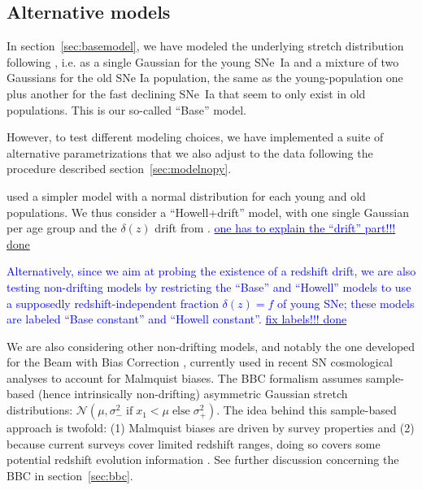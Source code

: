 \documentclass[]{aa} %
\newcommand{\nn}[1]{{\textcolor[rgb]{1, 0.27, 0}{#1}}}
\newcommand{\yc}[1]{{\textcolor{blue}{#1}}}
\begin{document}
\subsection{Alternative models}
\label{sec:othermodel}

In section~\nn{\ref{sec:basemodel}}, we have modeled the underlying stretch
distribution following \cite{rigault2018}, i.e. as a single Gaussian for the young SNe~Ia and a mixture of two
Gaussians for the old SNe Ia population, the same as the young-population
one plus another for the fast declining SNe~Ia that seem to only exist in old
populations. This is our so-called ``Base'' model.

However, to test \nn{different modeling choices}, we have implemented a suite
of alternative parametrizations that we also adjust to the data following the procedure
described section~\ref{sec:modelnopy}. 


\cite{howell2007} used a simpler model with a normal distribution for each young 
and old populations. \nn{We thus consider a ``Howell+drift'' model, with one 
single Gaussian per age group and the $\delta(z)$ drift from \cite{rigault2018}}. \uline{\yc{one has to explain the ``drift'' part!!!} \nn{done}}

\yc{Alternatively, since we aim at probing the existence of a redshift drift, 
we are also testing non-drifting models by restricting the ``Base'' and ``Howell'' models to use a supposedly redshift-independent fraction $\delta(z) = f$ of young SNe; these models are labeled ``Base constant'' and ``Howell constant''.} \yc{\uline{fix labels!!! \nn{done}}}

We are also considering other non-drifting models, and notably the one
developed for the Beam with Bias Correction \cite[BBC,][]{scolnic2016,
kessler2017}, currently used in recent SN cosmological analyses
\cite[e.g.][]{scolnic2018a, descosmopaper2019, riess2016, riess2019} to account
for Malmquist biases. The BBC formalism assumes sample-based (hence
intrinsically non-drifting) asymmetric Gaussian stretch distributions: $\mathcal{N}\left(\mu,
\sigma_{-}^2\;\text{if}\;x_1<\mu\;\text{else}\;\sigma_{+}^2\right)$. The
idea behind this sample-based approach is twofold: (1) Malmquist biases are
driven by survey properties and (2) because current surveys cover limited
redshift ranges, doing so covers some potential redshift evolution information
\citep{scolnic2016, scolnic2018a}. See further discussion concerning the BBC in section~\ref{sec:bbc}. 
\end{document}
